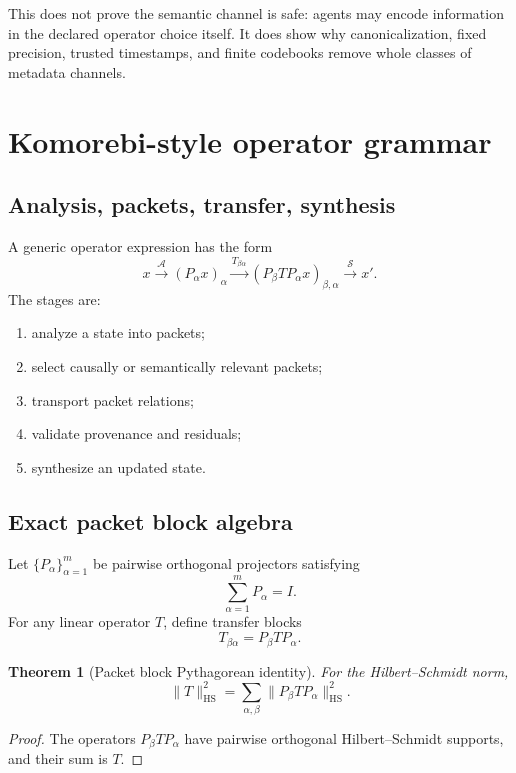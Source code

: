 \documentclass[11pt]{article}
\newtheorem{theorem}{Theorem}[section]
\theoremstyle{definition}
\theoremstyle{remark}
\begin{document}
This does not prove the semantic channel is safe: agents may encode information in the declared operator choice itself. It does show why canonicalization, fixed precision, trusted timestamps, and finite codebooks remove whole classes of metadata channels.

\section{Komorebi-style operator grammar}

\subsection{Analysis, packets, transfer, synthesis}

A generic operator expression has the form
\[
x
\xrightarrow{\mathcal A}
(P_\alpha x)_\alpha
\xrightarrow{T_{\beta\alpha}}
(P_\beta T P_\alpha x)_{\beta,\alpha}
\xrightarrow{\mathcal S}
x'.
\]
The stages are:
\begin{enumerate}[leftmargin=1.7em]
  \item analyze a state into packets;
  \item select causally or semantically relevant packets;
  \item transport packet relations;
  \item validate provenance and residuals;
  \item synthesize an updated state.
\end{enumerate}

\subsection{Exact packet block algebra}

Let \(\{P_\alpha\}_{\alpha=1}^m\) be pairwise orthogonal projectors satisfying
\[
\sum_{\alpha=1}^mP_\alpha=I.
\]
For any linear operator \(T\), define transfer blocks
\[
T_{\beta\alpha}=P_\beta T P_\alpha.
\]

\begin{theorem}[Packet block Pythagorean identity]
For the Hilbert--Schmidt norm,
\[
\|T\|_{\mathrm{HS}}^2
=
\sum_{\alpha,\beta}
\|P_\beta T P_\alpha\|_{\mathrm{HS}}^2.
\]
\end{theorem}

\begin{proof}
The operators \(P_\beta T P_\alpha\) have pairwise orthogonal Hilbert--Schmidt supports, and their sum is \(T\).
\end{proof}
\end{document}
